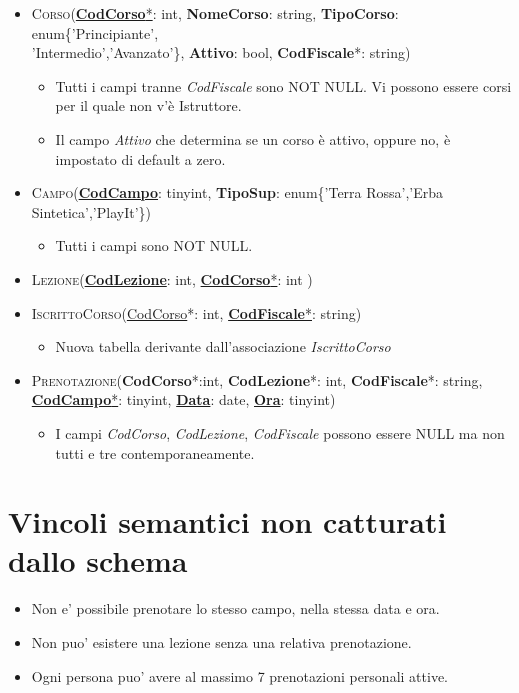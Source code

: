 \begin{itemize}
\item \textsc{Corso}(\underline{\textbf{CodCorso}*}: int, \textbf{NomeCorso}: string, \textbf{TipoCorso}: enum\{'Principiante',\\'Intermedio','Avanzato'\}, \textbf{Attivo}: bool, \textbf{CodFiscale}*: string)
\begin{itemize}
\item Tutti i campi tranne \textit{CodFiscale} sono NOT NULL. Vi possono essere corsi per il quale non v'è Istruttore.
\item Il campo \textit{Attivo} che determina se un corso è attivo, oppure no, è impostato di default a zero.
\end{itemize}
\item \textsc{Campo}(\underline{\textbf{CodCampo}}: tinyint, \textbf{TipoSup}: enum\{'Terra Rossa','Erba Sintetica','PlayIt'\})
\begin{itemize}
\item Tutti i campi sono NOT NULL.
\end{itemize}

\item \textsc{Lezione}(\underline{\textbf{CodLezione}}: int, \underline{\textbf{CodCorso}*}: int )   
\item \textsc{IscrittoCorso}(\underline{CodCorso}*: int, \underline{\textbf{CodFiscale}*}: string) 
\begin{itemize}
\item Nuova tabella derivante dall'associazione \textit{IscrittoCorso}
\end{itemize}
\item \textsc{Prenotazione}(\textbf{CodCorso}*:int, \textbf{CodLezione}*: int, \textbf{CodFiscale}*: string, \underline{\textbf{CodCampo}*}: tinyint, \underline{\textbf{Data}}: date, \underline{\textbf{Ora}}: tinyint)  
\begin{itemize}
\item I campi \textit{CodCorso}, \textit{CodLezione}, \textit{CodFiscale} possono essere NULL ma non tutti e tre contemporaneamente.
\end{itemize}
\end{itemize}

\section{Vincoli semantici non catturati dallo schema}
\begin{itemize}
\item Non e' possibile prenotare lo stesso campo, nella stessa data e ora.
\item Non puo' esistere una lezione senza una relativa prenotazione.
\item Ogni persona puo' avere al massimo 7 prenotazioni personali attive.
\end{itemize}

